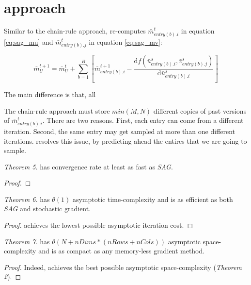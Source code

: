 \section{approach}
Similar to the chain-rule approach, \tool re-computes $\bar{m}_{entry(b).i}^{t}$ in equation \ref{eq:sag_mu} and $\bar{m}_{entry(b).j}^{t}$ in equation \ref{eq:sag_mv}:

\begin{equation} \label{eq:sagre_mu}
  \bar{m}_{U}^{t+1} = \bar{m}_{U}^{t} + \sum_{b=1}^{B}\left[\bar{m}_{entry(b).i}^{t+1} - \frac{\text{d}f(\bar{u}_{entry(b).i}^{s}, \bar{v}_{entry(b).j}^{s})}{\text{d}\bar{u}_{entry(b).i}^{s}} \right]
\end{equation}

The main difference is that, all 

The chain-rule approach must store $min(M,N)$ different copies of past versions of $\bar{m}_{entry(b).i}^{t}$.
There are two reasons.  First, each entry can come from a different iteration.  Second, the same entry may get sampled at more than one different iterations.  
\tool resolves this issue, by predicting ahead the entires that we are going to sample.  


\emph{Theorem 5.}
\tool has convergence rate at least as fast as \emph{SAG}.
\begin{proof}

\end{proof}


\emph{Theorem 6.}
\tool has $\theta(1)$ asymptotic time-complexity and is as efficient as both \emph{SAG} and stochastic gradient.
\begin{proof}
\tool achieves the lowest possible asymptotic iteration cost.
\end{proof}


\emph{Theorem 7.}
\tool has $\theta(N + nDims*(nRows+nCols))$ asymptotic space-complexity and is as compact as any memory-less gradient method.
\begin{proof}
Indeed, \tool achieves the best possible asymptotic space-complexity (\emph{Theorem 2}).
\end{proof}
